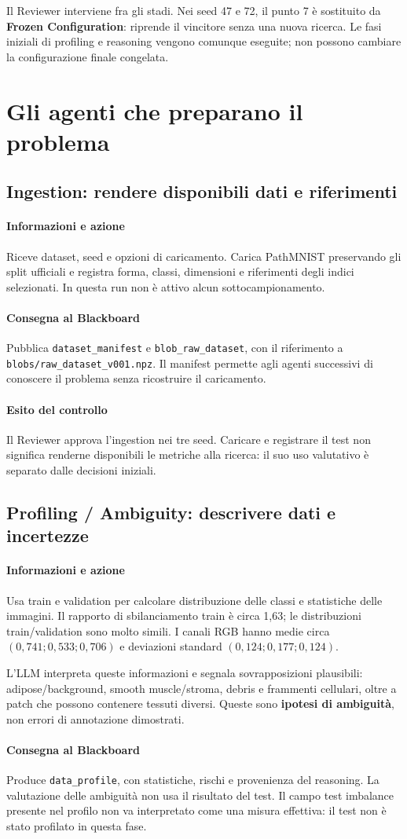 \documentclass[11pt,a4paper]{article}
\newcommand{\artefatto}[1]{\nolinkurl{#1}}
\newcommand{\file}[1]{\nolinkurl{#1}}
\newcommand{\ruolo}[1]{\paragraph{#1}}
\begin{document}
Il Reviewer interviene fra gli stadi. Nei seed 47 e 72, il punto 7 è sostituito
da \textbf{Frozen Configuration}: riprende il vincitore senza una nuova ricerca.
Le fasi iniziali di profiling e reasoning vengono comunque eseguite; non
possono cambiare la configurazione finale congelata.

\section{Gli agenti che preparano il problema}

\subsection{Ingestion: rendere disponibili dati e riferimenti}
\ruolo{Informazioni e azione}
Riceve dataset, seed e opzioni di caricamento. Carica PathMNIST preservando
gli split ufficiali e registra forma, classi, dimensioni e riferimenti degli
indici selezionati. In questa run non è attivo alcun sottocampionamento.

\ruolo{Consegna al Blackboard}
Pubblica \artefatto{dataset_manifest} e \artefatto{blob_raw_dataset}, con
il riferimento a \file{blobs/raw_dataset_v001.npz}. Il manifest permette
agli agenti successivi di conoscere il problema senza ricostruire il caricamento.

\ruolo{Esito del controllo}
Il Reviewer approva l'ingestion nei tre seed. Caricare e registrare il test
non significa renderne disponibili le metriche alla ricerca: il suo uso
valutativo è separato dalle decisioni iniziali.

\subsection{Profiling / Ambiguity: descrivere dati e incertezze}
\ruolo{Informazioni e azione}
Usa train e validation per calcolare distribuzione delle classi e statistiche
delle immagini. Il rapporto di sbilanciamento train è circa 1,63; le
distribuzioni train/validation sono molto simili. I canali RGB hanno medie
circa $(0,741;0,533;0,706)$ e deviazioni standard $(0,124;0,177;0,124)$.

L'LLM interpreta queste informazioni e segnala sovrapposizioni plausibili:
adipose/background, smooth muscle/stroma, debris e frammenti cellulari,
oltre a patch che possono contenere tessuti diversi. Queste sono
\textbf{ipotesi di ambiguità}, non errori di annotazione dimostrati.

\ruolo{Consegna al Blackboard}
Produce \artefatto{data_profile}, con statistiche, rischi e provenienza del
reasoning. La valutazione delle ambiguità non usa il risultato del test.
Il campo test imbalance presente nel profilo non va interpretato come una
misura effettiva: il test non è stato profilato in questa fase.
\end{document}

